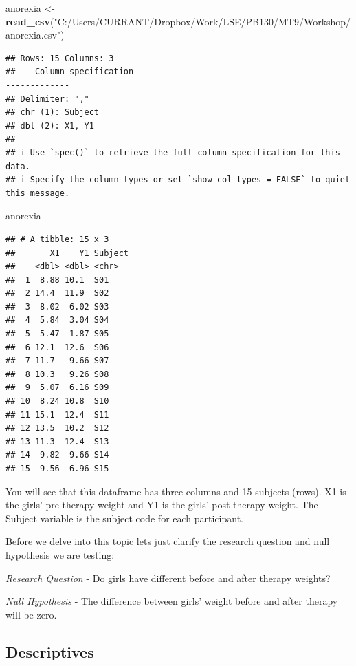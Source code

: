 \documentclass[
]{article}
\newenvironment{Shaded}{\begin{snugshade}}{\end{snugshade}}
\newcommand{\FunctionTok}[1]{\textcolor[rgb]{0.13,0.29,0.53}{\textbf{#1}}}
\newcommand{\NormalTok}[1]{#1}
\newcommand{\OtherTok}[1]{\textcolor[rgb]{0.56,0.35,0.01}{#1}}
\newcommand{\StringTok}[1]{\textcolor[rgb]{0.31,0.60,0.02}{#1}}
\begin{document}
\begin{Shaded}
\begin{Highlighting}[]
\NormalTok{anorexia }\OtherTok{\textless{}{-}} \FunctionTok{read\_csv}\NormalTok{(}\StringTok{"C:/Users/CURRANT/Dropbox/Work/LSE/PB130/MT9/Workshop/anorexia.csv"}\NormalTok{)}
\end{Highlighting}
\end{Shaded}

\begin{verbatim}
## Rows: 15 Columns: 3
## -- Column specification --------------------------------------------------------
## Delimiter: ","
## chr (1): Subject
## dbl (2): X1, Y1
## 
## i Use `spec()` to retrieve the full column specification for this data.
## i Specify the column types or set `show_col_types = FALSE` to quiet this message.
\end{verbatim}

\begin{Shaded}
\begin{Highlighting}[]
\NormalTok{anorexia}
\end{Highlighting}
\end{Shaded}

\begin{verbatim}
## # A tibble: 15 x 3
##       X1    Y1 Subject
##    <dbl> <dbl> <chr>  
##  1  8.88 10.1  S01    
##  2 14.4  11.9  S02    
##  3  8.02  6.02 S03    
##  4  5.84  3.04 S04    
##  5  5.47  1.87 S05    
##  6 12.1  12.6  S06    
##  7 11.7   9.66 S07    
##  8 10.3   9.26 S08    
##  9  5.07  6.16 S09    
## 10  8.24 10.8  S10    
## 11 15.1  12.4  S11    
## 12 13.5  10.2  S12    
## 13 11.3  12.4  S13    
## 14  9.82  9.66 S14    
## 15  9.56  6.96 S15
\end{verbatim}

You will see that this dataframe has three columns and 15 subjects
(rows). X1 is the girls' pre-therapy weight and Y1 is the girls'
post-therapy weight. The Subject variable is the subject code for each
participant.

Before we delve into this topic lets just clarify the research question
and null hypothesis we are testing:

\emph{Research Question} - Do girls have different before and after
therapy weights?

\emph{Null Hypothesis} - The difference between girls' weight before and
after therapy will be zero.

\subsection{Descriptives}\label{descriptives}
\end{document}
